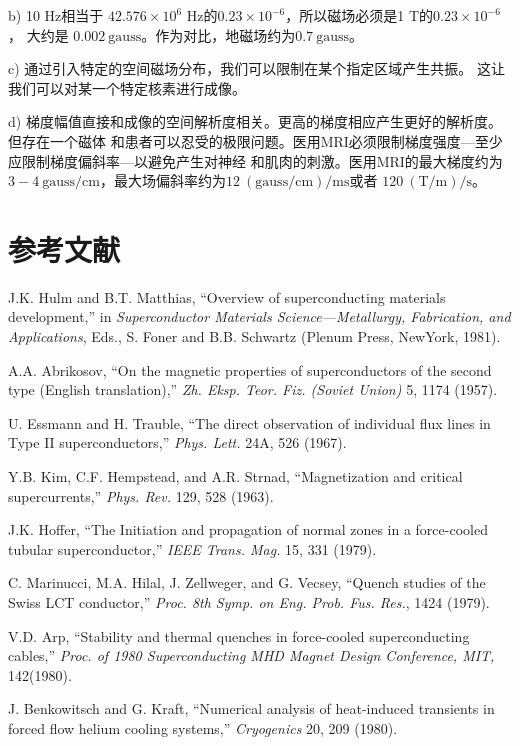 b) 10 Hz相当于 $42.576×10^6$ Hz的$0.23×10^{−6}$，所以磁场必须是1 T的$0.23×10^{−6}$ ，
大约是 $0.002\ \mathrm{gauss}$。作为对比，地磁场约为$0.7 \ \mathrm{gauss}$。

c) 通过引入特定的空间磁场分布，我们可以限制在某个指定区域产生共振。
这让我们可以对某一个特定核素进行成像。

d) 梯度幅值直接和成像的空间解析度相关。更高的梯度相应产生更好的解析度。但存在一个磁体
和患者可以忍受的极限问题。医用MRI必须限制梯度强度---至少应限制梯度偏斜率---以避免产生对神经
和肌肉的刺激。医用MRI的最大梯度约为$3-4 \ \mathrm{gauss/cm}$，最大场偏斜率约为$12\ \mathrm{(gauss/cm)/ms}$或者
$120\ \mathrm{(T/m)/s}$。

\section*{参考文献}
\noindent [1.1] J.K. Hulm and B.T. Matthias, ``Overview of superconducting materials development,”
in \textit{Superconductor Materials Science—Metallurgy, Fabrication, and Applications},
Eds., S. Foner and B.B. Schwartz (Plenum Press, NewYork, 1981).

\noindent [1.2] A.A. Abrikosov, ``On the magnetic properties of superconductors of the second
type (English translation),” \textit{Zh. Eksp. Teor. Fiz. (Soviet Union)} 5, 1174 (1957).

\noindent [1.3] U. Essmann and H. Trauble, ``The direct observation of individual flux lines in
Type II superconductors,” \textit{Phys. Lett.} 24A, 526 (1967).

\noindent [1.4] Y.B. Kim, C.F. Hempstead, and A.R. Strnad, ``Magnetization and critical supercurrents,” \textit{Phys. Rev.} 129, 528 (1963).

\noindent [1.5] J.K. Hoffer, ``The Initiation and propagation of normal zones in a force-cooled
tubular superconductor,” \textit{IEEE Trans. Mag.} 15, 331 (1979).

\noindent [1.6] C. Marinucci, M.A. Hilal, J. Zellweger, and G. Vecsey, ``Quench studies of the
Swiss LCT conductor,” \textit{Proc. 8th Symp. on Eng. Prob. Fus. Res.}, 1424 (1979).

\noindent [1.7] V.D. Arp, ``Stability and thermal quenches in force-cooled superconducting cables,”
\textit{Proc. of 1980 Superconducting MHD Magnet Design Conference, MIT,} 142(1980).

\noindent [1.8] J. Benkowitsch and G. Kraft, ``Numerical analysis of heat-induced transients in
forced flow helium cooling systems,” \textit{Cryogenics} 20, 209 (1980).

